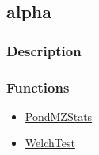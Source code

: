 \subsection{alpha}\label{alpha}
\subsubsection{Description}

\subsubsection{Functions}
\begin{itemize}
\item \hyperref[PondMZStats]{PondMZStats}
\item \hyperref[WelchTest]{WelchTest}
\end{itemize}

